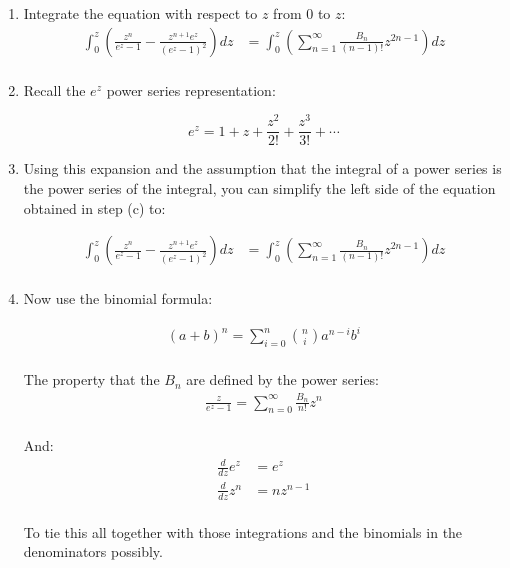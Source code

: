 \begin{enumerate}
\begin{enumerate}
      \item Integrate the equation with respect to $z$ from $0$ to $z$:
      \begin{align*}
        \int_{0}^{z} \left( \frac{z^n}{e^z - 1} - \frac{z^{n + 1} e^z}{(e^z - 1)^2} \right) dz &= \int_{0}^{z} \left( \sum_{n = 1}^{\infty}\frac{B_n}{(n-1)!}z^{2n-1} \right) dz \\
      \end{align*}

      \item Recall the $e^z$ power series representation:
    
      \[e^z = 1 + z + \frac{z^2}{2!} + \frac{z^3}{3!} + \cdots\]

      \item  Using this expansion and the assumption that the integral of a power series is the power series of the 
      integral, you can simplify the left side of the equation obtained in step (c) to:

      \begin{align*}
        \int_{0}^{z} \left( \frac{z^n}{e^z - 1} - \frac{z^{n + 1} e^z}{(e^z - 1)^2} \right) dz &= \int_{0}^{z} \left( \sum_{n = 1}^{\infty}\frac{B_n}{(n-1)!}z^{2n-1} \right) dz \\
      \end{align*}

      \item Now use the binomial formula:

      \begin{align*}
        (a + b)^n = \sum_{i = 0}^{n} {n \choose i} a^{n-i} b^i \\
      \end{align*}
      
      The property that the $B_n$ are defined 
      by the power series:
      \begin{align*}
        \frac{z}{e^z-1} = \sum_{n=0}^\infty \frac{B_n}{n!}z^n \\
      \end{align*}

      And:
      \begin{align*}
        \frac{d}{dz} e^z &= e^z \\
        \frac{d}{dz} z^n &= nz^{n-1} \\
      \end{align*}

      To tie this all together with those integrations and the binomials in the denominators possibly. 


\end{enumerate}
\end{enumerate}
